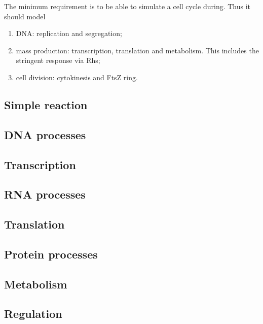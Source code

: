 The minimum requirement is to be able to simulate a cell cycle during. Thus it should model
\begin{enumerate}
  \item DNA: replication and segregation;
  \item mass production: transcription, translation and metabolism. This includes the stringent response via Rhs;
  \item cell division: cytokinesis and FtsZ ring.
\end{enumerate}




\subsection{Simple reaction}


\subsection{DNA processes}


\subsection{Transcription}


\subsection{RNA processes}


\subsection{Translation}


\subsection{Protein processes}


\subsection{Metabolism}


\subsection{Regulation}


